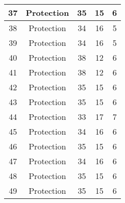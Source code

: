 \documentclass[results.tex]{subfiles}
\begin{document}
\begin{center}
\begin{tabular}{| c || c | c | c | c |}
            \hline
            37                      & Protection                   & 35                     & 15                      & 6                    \\
            \hline
            38                      & Protection                   & 34                     & 16                      & 5                    \\
            \hline
            39                      & Protection                   & 34                     & 16                      & 5                    \\
            \hline
            40                      & Protection                   & 38                     & 12                      & 6                    \\
            \hline
            41                      & Protection                   & 38                     & 12                      & 6                    \\
            \hline
            42                      & Protection                   & 35                     & 15                      & 6                    \\
            \hline
            43                      & Protection                   & 35                     & 15                      & 6                    \\
            \hline
            44                      & Protection                   & 33                     & 17                      & 7                    \\
            \hline
            45                      & Protection                   & 34                     & 16                      & 6                    \\
            \hline
            46                      & Protection                   & 35                     & 15                      & 6                    \\
            \hline
            47                      & Protection                   & 34                     & 16                      & 6                    \\
            \hline
            48                      & Protection                   & 35                     & 15                      & 6                    \\
            \hline
            49                      & Protection                   & 35                     & 15                      & 6                    \\
            \hline
        \end{tabular}
    \end{center}
\end{document}
